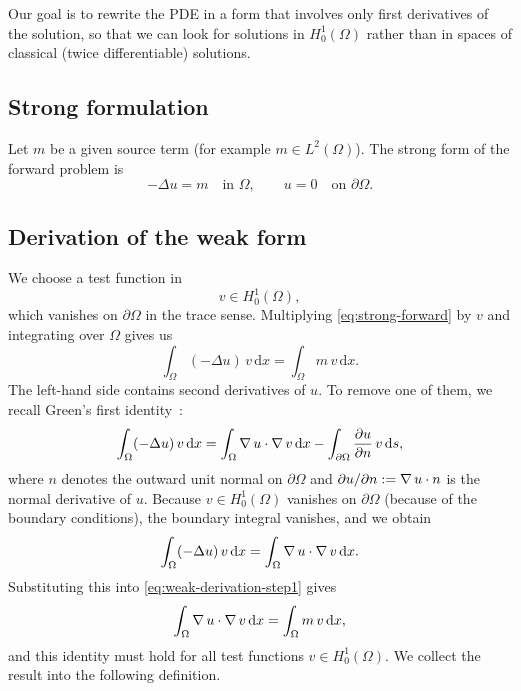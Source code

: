 \documentclass[a4paper,11pt]{article}
\newcommand{\Om}{\Omega}
\newcommand{\dom}{\partial\Omega}
\newcommand{\Lp}[1]{L^{2}(#1)}              %
\newcommand{\dx}{\,\mathrm{d}x}
\newcommand{\ds}{\,\mathrm{d}s}
\theoremstyle{spacedplain} \newtheorem{theorem}[counter]{Theorem} \newtheorem{lemma}[counter]{Lemma} \newtheorem{prop}[counter]{Proposition} \newtheorem{cor}[counter]{Corollary}
\theoremstyle{spaceddefinition} \newtheorem{defn}[counter]{Definition} \newtheorem{example}[counter]{Example} \newtheorem{remark}[counter]{Remark}
\begin{document}
Our goal is to rewrite the PDE in a form that involves only first derivatives of the solution, so that we can look for solutions in $H_0^1(\Om)$ rather than in spaces of classical (twice differentiable) solutions.

\subsection{Strong formulation}
\label{sec:poisson-weak:strong}

Let $m$ be a given source term (for example $m \in \Lp{\Om}$). The strong form of the forward problem is
\begin{equation}
  \label{eq:strong-forward}
  -\Delta u = m \quad \text{in } \Om,
  \qquad
  u = 0 \quad \text{on } \dom.
\end{equation}

\subsection{Derivation of the weak form}
\label{sec:poisson-weak:derivation}

We choose a test function in
\begin{equation}
  v \in H_0^1(\Om),
\end{equation}
which vanishes on $\dom$ in the trace sense. Multiplying \cref{eq:strong-forward} by $v$ and integrating over $\Om$ gives us
\begin{equation}
  \label{eq:weak-derivation-step1}
  \int_{\Om} (-\Delta u)\, v \dx = \int_{\Om} m\, v \dx.
\end{equation}
The left-hand side contains second derivatives of $u$. To remove one of them, we recall Green's first identity~\citep[Lemma~5.23]{hc2026}:
\begin{equation}
  \int_{\Om} (-\Delta u)\, v \dx
  = \int_{\Om} \grad u \cdot \grad v \dx
  - \int_{\dom} \frac{\partial u}{\partial n}\, v \ds,
\end{equation}
where $n$ denotes the outward unit normal on $\dom$ and $\partial u / \partial n := \operatorname{\nabla} u \cdot n$ is the normal derivative of $u$. Because $v \in H_0^1(\Om)$ vanishes on $\dom$ (because of the boundary conditions), the boundary integral vanishes, and we obtain
\begin{equation}
  \int_{\Om} (-\Delta u)\, v \dx
  = \int_{\Om} \grad u \cdot \grad v \dx.
\end{equation}
Substituting this into \cref{eq:weak-derivation-step1} gives
\begin{equation}
  \int_{\Om} \grad u \cdot \grad v \dx
  = \int_{\Om} m\, v \dx,
\end{equation}
and this identity must hold for all test functions $v \in H_0^1(\Om)$. We collect the result into the following definition.
\end{document}
